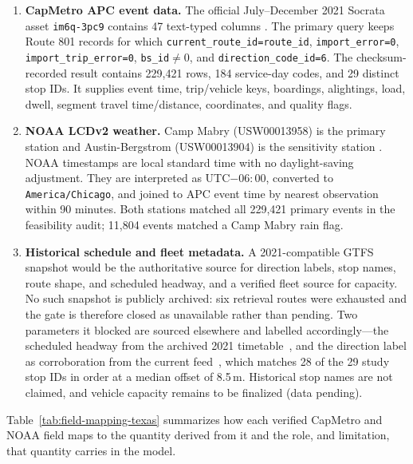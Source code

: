\begin{enumerate}
\item \textbf{CapMetro APC event data.} The official July--December 2021 Socrata asset \texttt{im6q-3pc9} contains 47 text-typed columns \cite{TexasCapMetroAPC2021}. The primary query keeps Route 801 records for which \texttt{current\_route\_id=route\_id}, \texttt{import\_error=0}, \texttt{import\_trip\_error=0}, \texttt{bs\_id}$\neq 0$, and \texttt{direction\_code\_id=6}. The checksum-recorded result contains 229{,}421 rows, 184 service-day codes, and 29 distinct stop IDs. It supplies event time, trip/vehicle keys, boardings, alightings, load, dwell, segment travel time/distance, coordinates, and quality flags.

\item \textbf{NOAA LCDv2 weather.} Camp Mabry (USW00013958) is the primary station and Austin-Bergstrom (USW00013904) is the sensitivity station \cite{NOAALCDv2}. NOAA timestamps are local standard time with no daylight-saving adjustment. They are interpreted as UTC$-06{:}00$, converted to \texttt{America/Chicago}, and joined to APC event time by nearest observation within 90 minutes. Both stations matched all 229{,}421 primary events in the feasibility audit; 11{,}804 events matched a Camp Mabry rain flag.

\item \textbf{Historical schedule and fleet metadata.} A 2021-compatible GTFS snapshot would be the authoritative source for direction labels, stop names, route shape, and scheduled headway, and a verified fleet source for capacity. No such snapshot is publicly archived: six retrieval routes were exhausted and the gate is therefore closed as unavailable rather than pending. Two parameters it blocked are sourced elsewhere and labelled accordingly---the scheduled headway from the archived 2021 timetable~\cite{CapMetro2021Timetable801}, and the direction label as corroboration from the current feed~\cite{CapMetroGTFS}, which matches 28 of the 29 study stop IDs in order at a median offset of 8.5\,m. Historical stop names are not claimed, and vehicle capacity remains to be finalized (data pending).
\end{enumerate}

Table~\ref{tab:field-mapping-texas} summarizes how each verified CapMetro and NOAA field maps to the quantity derived from it and the role, and limitation, that quantity carries in the model.

